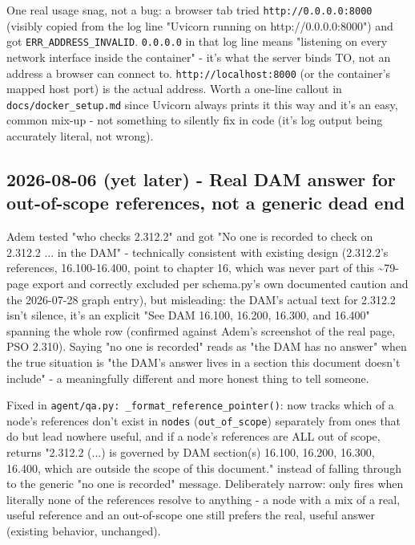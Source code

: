 One real usage snag, not a bug: a browser tab tried \texttt{http:/\allowbreak{}/\allowbreak{}0.0.0.0:8000} (visibly copied from the log line "Uvicorn running on http://0.0.0.0:8000") and got \texttt{ERR\_\allowbreak{}ADDRESS\_\allowbreak{}INVALID}. \texttt{0.0.0.0} in that log line means "listening on every network interface inside the container" - it's what the server binds TO, not an address a browser can connect to. \texttt{http:/\allowbreak{}/\allowbreak{}localhost:8000} (or the container's mapped host port) is the actual address. Worth a one-line callout in \texttt{docs/\allowbreak{}docker\_\allowbreak{}setup.md} since Uvicorn always prints it this way and it's an easy, common mix-up - not something to silently fix in code (it's log output being accurately literal, not wrong).

\subsection*{2026-08-06 (yet later) - Real DAM answer for out-of-scope references, not a generic dead end}
Adem tested "who checks 2.312.2" and got "No one is recorded to check on 2.312.2 ... in the DAM" - technically consistent with existing design (2.312.2's references, 16.100-16.400, point to chapter 16, which was never part of this \textasciitilde{}79-page export and correctly excluded per schema.py's own documented caution and the 2026-07-28 graph entry), but misleading: the DAM's actual text for 2.312.2 isn't silence, it's an explicit "See DAM 16.100, 16.200, 16.300, and 16.400" spanning the whole row (confirmed against Adem's screenshot of the real page, PSO 2.310). Saying "no one is recorded" reads as "the DAM has no answer" when the true situation is "the DAM's answer lives in a section this document doesn't include" - a meaningfully different and more honest thing to tell someone.

Fixed in \texttt{agent/\allowbreak{}qa.py: \_\allowbreak{}format\_\allowbreak{}reference\_\allowbreak{}pointer()}: now tracks which of a node's references don't exist in \texttt{nodes} (\texttt{out\_\allowbreak{}of\_\allowbreak{}scope}) separately from ones that do but lead nowhere useful, and if a node's references are ALL out of scope, returns "2.312.2 (...) is governed by DAM section(s) 16.100, 16.200, 16.300, 16.400, which are outside the scope of this document." instead of falling through to the generic "no one is recorded" message. Deliberately narrow: only fires when literally none of the references resolve to anything - a node with a mix of a real, useful reference and an out-of-scope one still prefers the real, useful answer (existing behavior, unchanged).

